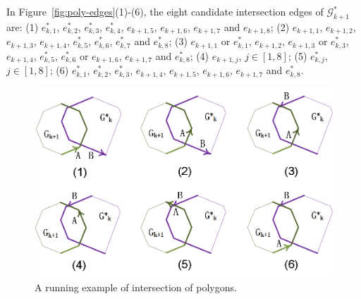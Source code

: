 \begin{example}
In Figure~\ref{fig:poly-edges}(1)-(6), the eight candidate intersection edges of $\mathcal{G}^*_{k+1}$ are:
(1) $e^*_{k,1}$, $e^*_{k,2}$, $e^*_{k,3}$, $e^*_{k,4}$, $e_{k+1,5}$, $e_{k+1,6}$, $e_{k+1,7}$ and $e_{k+1,8}$;
%
(2) $e_{k+1,1}$, $e_{k+1,2}$, $e_{k+1,3}$, $e_{k+1,4}$, $e^*_{k,5}$, $e^*_{k,6}$, $e^*_{k,7}$ and $e^*_{k,8}$;
%
(3) $e_{k+1,1}$ or $e^*_{k,1}$, $e_{k+1,2}$, $e_{k+1,3}$ or $e^*_{k,3}$, $e_{k+1,4}$, $e^*_{k,5}$, $e^*_{k,6}$ or $e_{k+1,6}$, $e_{k+1,7}$ and $e^*_{k,8}$;
%
(4) $e_{k+1,j}$, $j \in [1, 8]$;
%
(5) $e^*_{k,j}$, $j \in [1, 8]$;
%
(6) $e^*_{k,1}$, $e^*_{k,2}$, $e^*_{k,3}$, $e_{k+1,4}$, $e_{k+1,5}$, $e_{k+1,6}$, $e_{k+1,7}$ and $e^*_{k,8}$.
\end{example}





\begin{figure}[tb!]
\centering
\includegraphics[scale=0.88]{figures/Fig-poly-inter.png}
\vspace{-1ex}
\caption{\small A running example of intersection of polygons.}
\vspace{-2ex}
\label{fig:p-poly-inter}
\end{figure}




